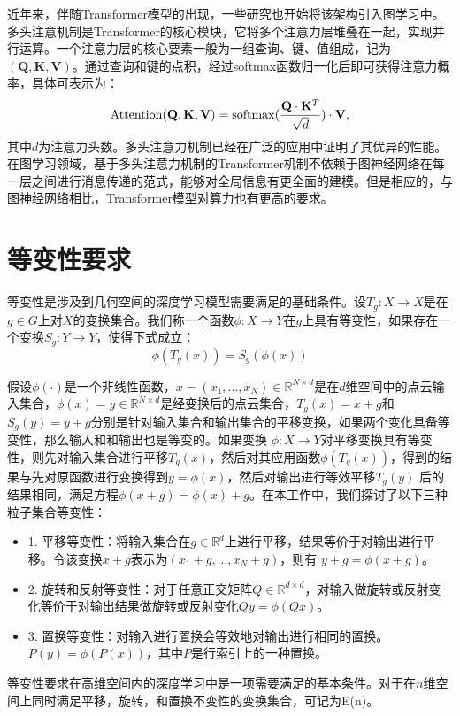 近年来，伴随Transformer模型的出现，一些研究也开始将该架构引入图学习中。多头注意机制是Transformer的核心模块，它将多个注意力层堆叠在一起，实现并行运算。一个注意力层的核心要素一般为一组查询、键、值组成，记为$(\mathbf{Q}, \mathbf{K}, \mathbf{V})$。通过查询和键的点积，经过softmax函数归一化后即可获得注意力概率，具体可表示为：
\begin{eqnarray}
    {\rm Attention}(\mathbf{Q}, \mathbf{K}, \mathbf{V}) = {\rm softmax}(\frac{\mathbf{Q} \cdot \mathbf{K}^T}{\sqrt{d}}) \cdot \mathbf{V},
\end{eqnarray}
其中$d$为注意力头数。多头注意力机制已经在广泛的应用中证明了其优异的性能。在图学习领域，基于多头注意力机制的Transformer机制不依赖于图神经网络在每一层之间进行消息传递的范式，能够对全局信息有更全面的建模。但是相应的，与图神经网络相比，Transformer模型对算力也有更高的要求。

\section{等变性要求}
等变性是涉及到几何空间的深度学习模型需要满足的基础条件。设$T_g: X \to X$是在$g \in G$上对$X$的变换集合。我们称一个函数$\phi: X \to Y$在$g$上具有等变性，如果存在一个变换$S_g: Y \to Y$，使得下式成立：
\begin{equation}
    \phi (T_g(x)) = S_g(\phi (x))
\end{equation}

假设$\phi (\cdot)$是一个非线性函数，$x = (x_1, ..., x_N) \in \mathbb{R}^{N \times d}$是在$d$维空间中的点云输入集合，$\phi (x) = y \in \mathbb{R}^{N \times d}$是经变换后的点云集合，$T_g (x) = x + g$和$S_g(y) = y + g$分别是针对输入集合和输出集合的平移变换，如果两个变化具备等变性，那么输入和和输出也是等变的。如果变换 $\phi : X \to Y$对平移变换具有等变性，则先对输入集合进行平移$T_g(x)$，然后对其应用函数$\phi(T_g(x))$，得到的结果与先对原函数进行变换得到$y = \phi(x)$，然后对输出进行等效平移$T_g(y)$ 后的结果相同，满足方程$\phi (x+g) = \phi (x) + g$。在本工作中，我们探讨了以下三种粒子集合等变性：
\begin{itemize}
    \item 1. 平移等变性：将输入集合在$g \in \mathbb{R}^d$上进行平移，结果等价于对输出进行平移。令该变换$x + g$表示为$(x_1+g, ..., x_N + g)$，则有 $y+g = \phi (x+g)$。
    \item 2. 旋转和反射等变性：对于任意正交矩阵$Q \in \mathbb{R}^{d \times d}$，对输入做旋转或反射变化等价于对输出结果做旋转或反射变化$Qy = \phi(Qx)$。
    \item 3. 置换等变性：对输入进行置换会等效地对输出进行相同的置换。$P(y) = \phi(P(x))$，其中$P$是行索引上的一种置换。
\end{itemize}
等变性要求在高维空间内的深度学习中是一项需要满足的基本条件。对于在$n$维空间上同时满足平移，旋转，和置换不变性的变换集合，可记为E(n)。


